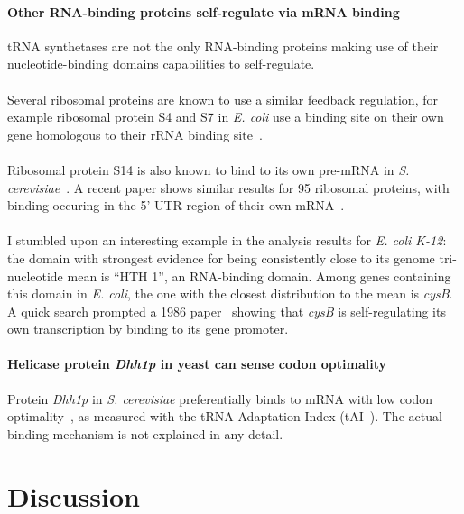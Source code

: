 \documentclass[12pt]{article}
\begin{document}
\paragraph{Other RNA-binding proteins self-regulate via mRNA binding}
tRNA synthetases are not the only RNA-binding proteins making use of their nucleotide-binding domains capabilities to self-regulate.\\
\\
Several ribosomal proteins are known to use a similar feedback regulation, for example ribosomal protein S4 and S7 in \textit{E. coli} use a binding site on their own gene homologous to their rRNA binding site~\cite{nomura1980feedback}.\\
\\
Ribosomal protein S14 is also known to bind to its own pre-mRNA in \textit{S. cerevisiae}~\cite{fewell1999ribosomal}. A recent paper shows similar results for 95 ribosomal proteins, with binding occuring in the 5' UTR region of their own mRNA~\cite{roy2020autoregulation}.\\
\\
I stumbled upon an interesting example in the analysis results for \textit{E. coli K-12}: the domain with strongest evidence for being consistently close to its genome tri-nucleotide mean is ``HTH 1'', an RNA-binding domain. Among genes containing this domain in \textit{E. coli}, the one with the closest distribution to the mean is \textit{cysB}. A quick search prompted a 1986 paper~\cite{bielinska1986regulation} showing that \textit{cysB} is self-regulating its own transcription by binding to its gene promoter.

\paragraph{Helicase protein \textit{Dhh1p} in yeast can sense codon optimality}
Protein \textit{Dhh1p} in \textit{S. cerevisiae} preferentially binds to mRNA with low codon optimality~\cite{radhakrishnan2016dead}, as measured with the tRNA Adaptation Index (tAI~\cite{reis2004solving}). The actual binding mechanism is not explained in any detail.

\pagebreak

\section{Discussion}
\end{document}
